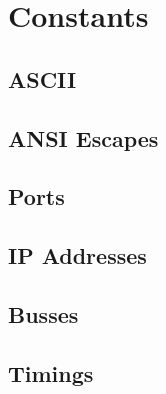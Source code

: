 \documentclass[twocolumn]{article}
\begin{document}
\section*{Constants}

\subsection*{ASCII}


\subsection*{ANSI Escapes}


\subsection*{Ports}


\subsection*{IP Addresses}


\subsection*{Busses}


\subsection*{Timings}

\end{document}
